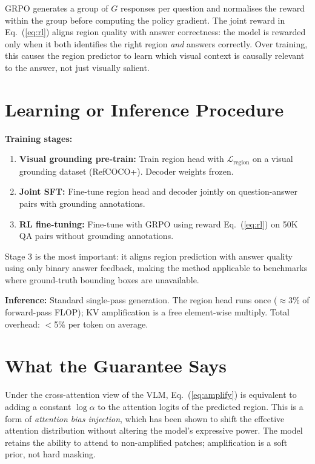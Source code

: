 \documentclass[10pt,twocolumn]{article}
\begin{document}
GRPO generates a group of $G$ responses per question and normalises the reward within the group before computing the policy gradient.
The joint reward in Eq.~(\ref{eq:rl}) aligns region quality with answer correctness: the model is rewarded only when it both identifies the right region \emph{and} answers correctly.
Over training, this causes the region predictor to learn which visual context is causally relevant to the answer, not just visually salient.

\section{Learning or Inference Procedure}

\textbf{Training stages:}
\begin{enumerate}[leftmargin=1.5em,itemsep=1pt]
  \item \textbf{Visual grounding pre-train:} Train region head with $\mathcal{L}_{\mathrm{region}}$ on a visual grounding dataset (RefCOCO+). Decoder weights frozen.
  \item \textbf{Joint SFT:} Fine-tune region head and decoder jointly on question-answer pairs with grounding annotations.
  \item \textbf{RL fine-tuning:} Fine-tune with GRPO using reward Eq.~(\ref{eq:rl}) on 50K QA pairs without grounding annotations.
\end{enumerate}

Stage 3 is the most important: it aligns region prediction with answer quality using only binary answer feedback, making the method applicable to benchmarks where ground-truth bounding boxes are unavailable.

\textbf{Inference:} Standard single-pass generation.
The region head runs once ($\approx$3\% of forward-pass FLOP); KV amplification is a free element-wise multiply.
Total overhead: $<$5\% per token on average.

\section{What the Guarantee Says}

Under the cross-attention view of the VLM, Eq.~(\ref{eq:amplify}) is equivalent to adding a constant $\log\alpha$ to the attention logits of the predicted region.
This is a form of \emph{attention bias injection}, which has been shown to shift the effective attention distribution without altering the model's expressive power.
The model retains the ability to attend to non-amplified patches; amplification is a soft prior, not hard masking.
\end{document}

